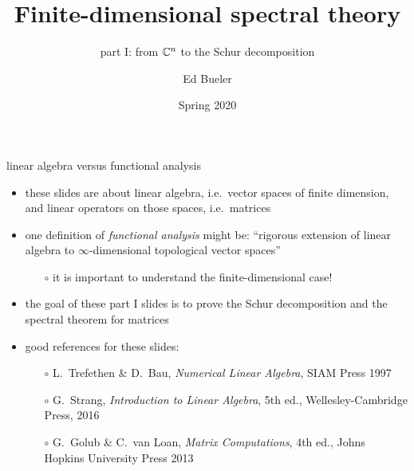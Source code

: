 \documentclass[10pt,hyperref]{beamer}
\title{Finite-dimensional spectral theory}
\subtitle{part I: from $\mathbb{C}^n$ to the Schur decomposition}
\author{Ed Bueler}
\institute[MATH 617]{MATH 617 Functional Analysis}
\date{Spring 2020}
\begin{document}
\beamertemplatenavigationsymbolsempty

\begin{frame}
  \maketitle
\end{frame}


\begin{frame}{linear algebra versus functional analysis}

\begin{itemize}
\item these slides are about linear algebra, i.e.~vector spaces of finite dimension, and linear operators on those spaces, i.e.~matrices
\item one definition of \emph{functional analysis} might be: ``rigorous extension of linear algebra to $\infty$-dimensional topological vector spaces''
    \begin{itemize}
    \item[$\circ$] it is important to understand the finite-dimensional case!
    \end{itemize}
\item the goal of these part I slides is to prove the Schur decomposition and the spectral theorem for matrices
\item good references for these slides:
    \begin{itemize}
    \item[$\circ$] L.~Trefethen \& D.~Bau, \emph{Numerical Linear Algebra}, SIAM Press 1997
    \item[$\circ$] G.~Strang, \emph{Introduction to Linear Algebra}, 5th ed., Wellesley-Cambridge Press, 2016
    \item[$\circ$] G.~Golub \& C.~van Loan, \emph{Matrix Computations}, 4th ed., Johns Hopkins University Press 2013
    \end{itemize}

\end{itemize}
\end{frame}
\end{document}

